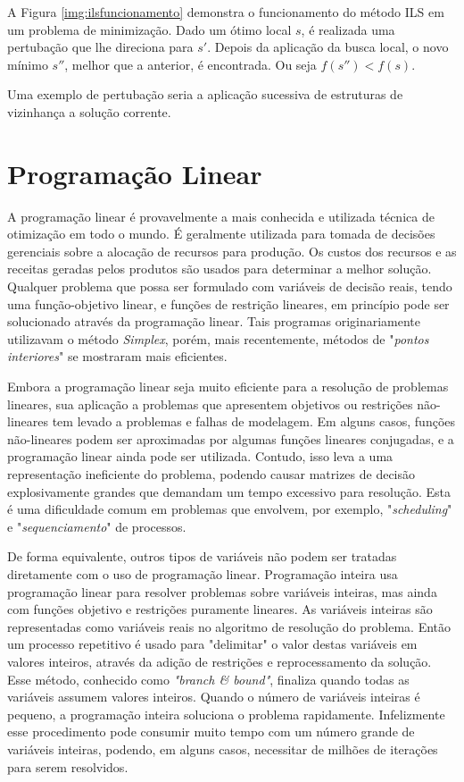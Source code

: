 A Figura \ref{img:ilsfuncionamento} demonstra o funcionamento do método ILS em um problema de minimização. Dado um ótimo local $s$, é realizada uma pertubação que lhe direciona para $s{'}$. Depois da aplicação da busca local, o novo mínimo $s{''}$, melhor que a anterior, é encontrada. Ou seja $f(s{''}) < f(s)$.

Uma exemplo de pertubação seria a aplicação sucessiva de estruturas de vizinhança a solução corrente.

\section{Programação Linear}

A programação linear é provavelmente a mais conhecida e utilizada técnica de otimização em todo o mundo. É geralmente utilizada para tomada de decisões gerenciais sobre a alocação de recursos para produção. Os custos dos recursos e as receitas geradas pelos produtos são usados para determinar a melhor solução. Qualquer problema que possa ser formulado com variáveis de decisão reais, tendo uma função-objetivo linear, e funções de restrição lineares, em princípio pode ser solucionado através da programação linear. Tais programas originariamente utilizavam o método \textit{Simplex}, porém, mais recentemente, métodos de "\textit{pontos interiores}" se mostraram mais eficientes.

Embora a programação linear seja muito eficiente para a resolução de problemas lineares, sua aplicação a problemas que apresentem objetivos ou restrições não-lineares tem levado a problemas e falhas de modelagem. Em alguns casos, funções não-lineares podem ser aproximadas por algumas funções lineares conjugadas, e a programação linear ainda pode ser utilizada. Contudo, isso leva a uma representação ineficiente do problema, podendo causar matrizes de decisão explosivamente grandes que demandam um tempo excessivo para resolução. Esta é uma dificuldade comum em problemas que envolvem, por exemplo, "\textit{scheduling}" e "\textit{sequenciamento}" de processos.

De forma equivalente, outros tipos de variáveis não podem ser tratadas diretamente com o uso de programação linear. Programação inteira usa programação linear para resolver problemas sobre variáveis inteiras, mas ainda com funções objetivo e restrições puramente lineares. As variáveis inteiras são representadas como variáveis reais no algoritmo de resolução do problema. Então um processo repetitivo é usado para "delimitar" o valor destas variáveis em valores inteiros, através da adição de restrições e reprocessamento da solução. Esse método, conhecido como \textit{"branch \& bound"}, finaliza quando todas as variáveis assumem valores inteiros. Quando o número de variáveis inteiras é pequeno, a programação inteira soluciona o problema rapidamente. Infelizmente esse procedimento pode consumir muito tempo com um número grande de variáveis inteiras, podendo, em alguns casos, necessitar de milhões de iterações para serem resolvidos.
 	
